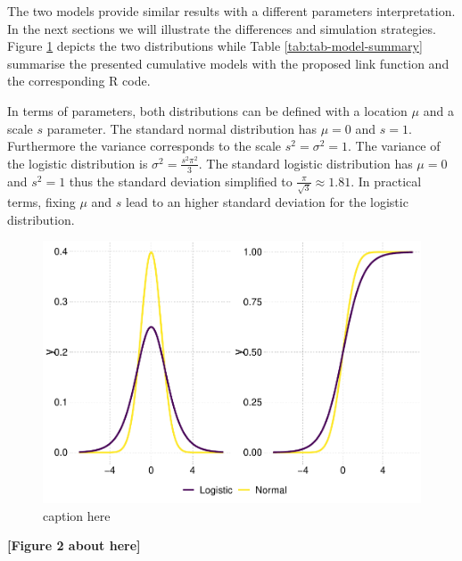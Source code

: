 \documentclass[
  man,floatsintext]{apa6}
\begin{document}
The two models provide similar results with a different parameters interpretation. In the next sections we will illustrate the differences and simulation strategies. Figure \ref{fig:fig-logit-vs-probit} depicts the two distributions while Table \ref{tab:tab-model-summary} summarise the presented cumulative models with the proposed link function and the corresponding R code.

In terms of parameters, both distributions can be defined with a location \(\mu\) and a scale \(s\) parameter. The standard normal distribution has \(\mu = 0\) and \(s = 1\). Furthermore the variance corresponds to the scale \(s^2 = \sigma^2 = 1\). The variance of the logistic distribution is \(\sigma^2 = \frac{s^2\pi^2}{3}\). The standard logistic distribution has \(\mu = 0\) and \(s^2 = 1\) thus the standard deviation simplified to \(\frac{\pi}{\sqrt{3}} \approx 1.81\). In practical terms, fixing \(\mu\) and \(s\) lead to an higher standard deviation for the logistic distribution.

\scriptsize

\begin{figure}

{\centering \includegraphics{paper-new_files/figure-latex/fig-logit-vs-probit-1} 

}

\caption{caption here}\label{fig:fig-logit-vs-probit}
\end{figure}

\begin{center}\textbf{[Figure 2 about here]} \end{center}

\normalsize
\end{document}
